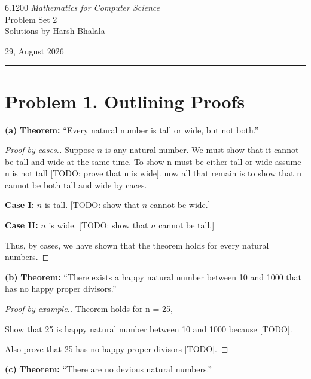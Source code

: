 \documentclass{article}
\begin{document}
\noindent
\begin{minipage}[t]{0.68\textwidth}
    {\large 6.1200 \textit{Mathematics for Computer Science}}\\[4pt]
    {\large Problem Set 2}\\[4pt]
    {\large Solutions by Harsh Bhalala}
\end{minipage}%
\hfill
\begin{minipage}[t]{0.27\textwidth}
    \raggedleft
    {\large 29, August 2026}
\end{minipage}

\vspace{6pt}

\noindent\rule{\textwidth}{0.5pt}

\section*{Problem 1. Outlining Proofs}
\noindent\textbf{(a)} \textbf{Theorem:} “Every natural number is tall or wide, but not both.”

\begin{proof}[Proof by cases.]
Suppose $n$ is any natural number. We must show that it cannot be tall and wide at the same time.
To show n must be either tall or wide assume n is not tall [TODO: prove that n is wide].
now all that remain is to show that n cannot be both tall and wide by caces.

\textbf{Case I:} $n$ is tall. 
[TODO: show that $n$ cannot be wide.]

\textbf{Case II:} $n$ is wide.
[TODO: show that $n$ cannot be tall.]

Thus, by cases, we have shown that the theorem holds for every natural numbers.
\end{proof}

\noindent\textbf{(b)} \textbf{Theorem:} “There exists a happy natural number between 10 and 1000 that has no happy proper divisors.”

\begin{proof}[Proof by example.]
Theorem holds for n = 25,

Show that 25 is happy natural number between 10 and 1000 because [TODO].
    
Also prove that 25 has no happy proper divisors [TODO].

\end{proof}

\noindent\textbf{(c)} \textbf{Theorem:} “There are no devious natural numbers.”
\end{document}
